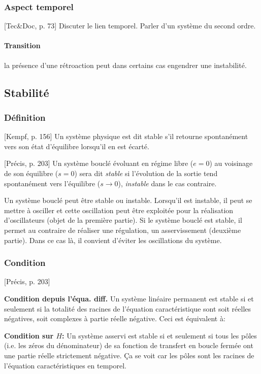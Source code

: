 \documentclass[11pt]{report}
\numberwithin{figure}{section}
\numberwithin{equation}{section}
\numberwithin{table}{section}
\newcommand{\1}{\boldsymbol{1}}
\begin{document}
\subsubsection{Aspect temporel}


[Tec\&Doc, p. 73] Discuter le lien temporel. Parler d'un système du second ordre.

\paragraph{Transition} la présence d'une rétroaction peut dans certains cas engendrer une instabilité.

\subsection{Stabilité}

\subsubsection{Définition}

[Kempf, p. 156] Un système physique est dit stable s'il retourne spontanément vers son état d'équilibre lorsqu'il en est écarté.

[Précis, p. 203] Un système bouclé évoluant en régime libre ($e=0$) au voisinage de son équilibre ($s=0$) sera dit \textit{stable} si l'évolution de la sortie tend spontanément vers l'équilibre ($s \rightarrow 0$), \textit{instable} dans le cas contraire.

Un système bouclé peut être stable ou instable. Lorsqu'il est instable, il peut se mettre à osciller et cette oscillation peut être exploitée pour la réalisation d'oscillateurs (objet de la première partie).
Si le système bouclé est stable, il permet au contraire de réaliser une régulation, un asservissement (deuxième partie). Dans ce cas là, il convient d'éviter les oscillations du système.

\subsubsection{Condition}

[Précis, p. 203]

\textbf{Condition depuis l'équa. diff.} Un système linéaire permanent est stable si et seulement si la totalité des racines de l'équation caractéristique sont soit réelles négatives, soit complexes à partie réelle négative. Ceci est équivalent à:

\textbf{Condition sur $H$:} Un système asservi est stable si et seulement si tous les pôles (i.e. les zéros du dénominateur) de sa fonction de transfert en boucle fermée ont une partie réelle strictement négative. Ça se voit car les pôles sont les racines de l'équation caractéristiques en temporel. \newline
\end{document}
